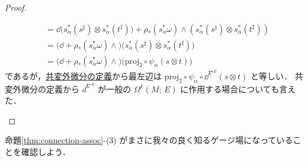 \documentclass[TQFT_main]{subfiles}
\begin{document}
\begin{proof}
\begin{enumerate}
\begin{align}
            &= \dd \bigl( s_\alpha^* (s^\sharp) \otimes s_\alpha^* (t^\sharp) \bigr) + \rho_* (s_\alpha^* \omega) \wedge (s_\alpha^* (s^\sharp) \otimes s_\alpha^*(t^\sharp)) \\
            &= \bigl( \dd + \rho_*(s_\alpha^*\omega) \wedge \bigr)  \bigl(s_\alpha^* (s^\sharp) \otimes s_\alpha^* (t^\sharp)  \bigr) \\
            &= \bigl( \dd + \rho_*(s_\alpha^*\omega) \wedge \bigr)  \bigl(\mathrm{proj}_2 \circ \psi_\alpha (s \otimes t) \bigr)
        \end{align}
        であるが，\hyperref[def:connection-vect]{共変外微分の定義}から最左辺は $\mathrm{proj}_2 \circ \psi_\alpha \circ \dd^{\nabla^E}(s \otimes t)$ と等しい．
        共変外微分の定義から $d^{\nabla^E}$ が一般の $\Omega^k(M;\, E)$ に作用する場合についても言えた．
    \end{enumerate}
\end{proof}

命題\ref{thm:connection-assoc}-(3) がまさに我々の良く知るゲージ場になっていることを確認しよう．
\end{document}

